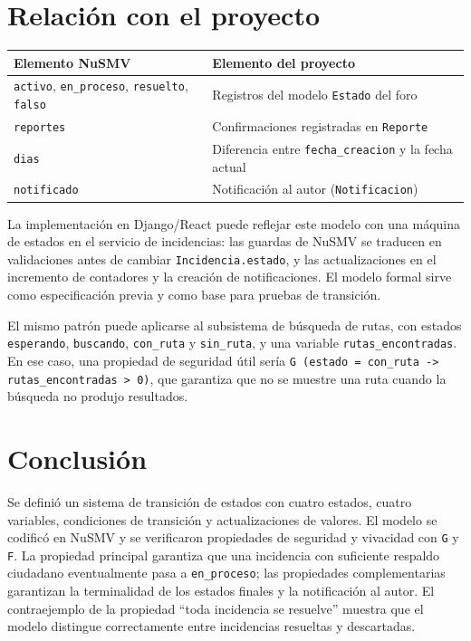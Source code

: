 \documentclass[11pt,a4paper]{article}
\begin{document}
\section{Relación con el proyecto}

\begin{center}
\begin{tabular}{|p{5.5cm}|p{9cm}|}
\hline
\textbf{Elemento NuSMV} & \textbf{Elemento del proyecto} \\
\hline
\texttt{activo}, \texttt{en\_proceso}, \texttt{resuelto}, \texttt{falso} & Registros del modelo \texttt{Estado} del foro \\
\hline
\texttt{reportes} & Confirmaciones registradas en \texttt{Reporte} \\
\hline
\texttt{dias} & Diferencia entre \texttt{fecha\_creacion} y la fecha actual \\
\hline
\texttt{notificado} & Notificación al autor (\texttt{Notificacion}) \\
\hline
\end{tabular}
\end{center}

La implementación en Django/React puede reflejar este modelo con una máquina de estados en el servicio de incidencias: las guardas de NuSMV se traducen en validaciones antes de cambiar \texttt{Incidencia.estado}, y las actualizaciones en el incremento de contadores y la creación de notificaciones. El modelo formal sirve como especificación previa y como base para pruebas de transición.

El mismo patrón puede aplicarse al subsistema de búsqueda de rutas, con estados \texttt{esperando}, \texttt{buscando}, \texttt{con\_ruta} y \texttt{sin\_ruta}, y una variable \texttt{rutas\_encontradas}. En ese caso, una propiedad de seguridad útil sería \texttt{G (estado = con\_ruta -> rutas\_encontradas > 0)}, que garantiza que no se muestre una ruta cuando la búsqueda no produjo resultados.

\section{Conclusión}

Se definió un sistema de transición de estados con cuatro estados, cuatro variables, condiciones de transición y actualizaciones de valores. El modelo se codificó en NuSMV y se verificaron propiedades de seguridad y vivacidad con \texttt{G} y \texttt{F}. La propiedad principal garantiza que una incidencia con suficiente respaldo ciudadano eventualmente pasa a \texttt{en\_proceso}; las propiedades complementarias garantizan la terminalidad de los estados finales y la notificación al autor. El contraejemplo de la propiedad ``toda incidencia se resuelve'' muestra que el modelo distingue correctamente entre incidencias resueltas y descartadas.
\end{document}
